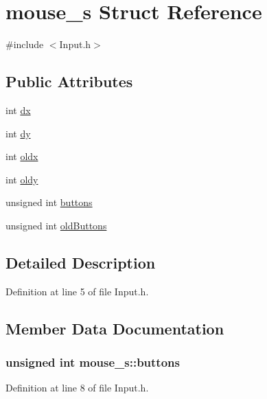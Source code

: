 \hypertarget{structmouse__s}{
\section{mouse\_\-s Struct Reference}
\label{structmouse__s}
}


{\ttfamily \#include $<$Input.h$>$}

\subsection*{Public Attributes}
\begin{DoxyCompactItemize}
\item 
int \hyperlink{structmouse__s_a0e62a901adba2b5ad9a4683741e36066}{dx}
\item 
int \hyperlink{structmouse__s_a0307abea3a0b8bb5627ec454fec38b16}{dy}
\item 
int \hyperlink{structmouse__s_a5f5a88b4a654513f521c431c76ae1aa2}{oldx}
\item 
int \hyperlink{structmouse__s_ac1fd8b44363e16df9f9bf9786748207d}{oldy}
\item 
unsigned int \hyperlink{structmouse__s_a83315ca1c08fe5ad3b16a4ac1abd14ce}{buttons}
\item 
unsigned int \hyperlink{structmouse__s_ae3096aae24073ce4325cd97a211dfe83}{oldButtons}
\end{DoxyCompactItemize}


\subsection{Detailed Description}


Definition at line 5 of file Input.h.



\subsection{Member Data Documentation}
\hypertarget{structmouse__s_a83315ca1c08fe5ad3b16a4ac1abd14ce}{
\subsubsection[{buttons}]{\setlength{\rightskip}{0pt plus 5cm}unsigned int {\bf mouse\_\-s::buttons}}}
\label{structmouse__s_a83315ca1c08fe5ad3b16a4ac1abd14ce}


Definition at line 8 of file Input.h.


